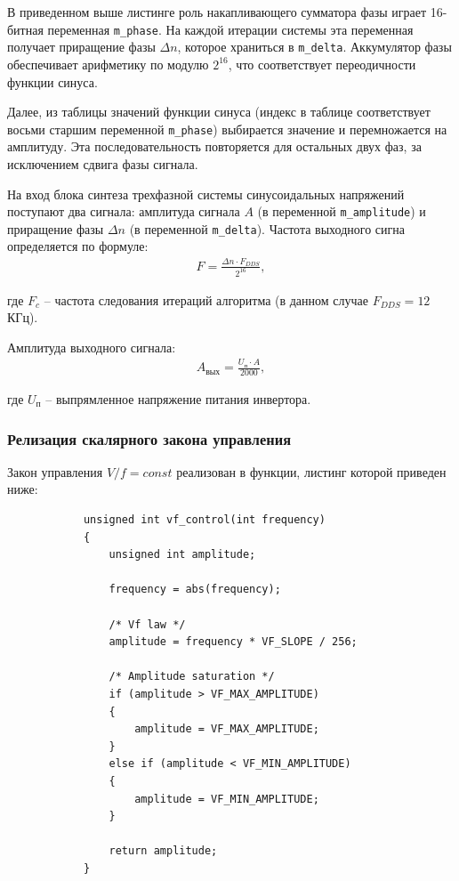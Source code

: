         В приведенном выше листинге роль накапливающего сумматора фазы играет
        16-битная переменная \verb"m_phase". На каждой итерации системы эта
        переменная получает приращение фазы $\Delta n$, которое храниться в
        \verb"m_delta". Аккумулятор фазы обеспечивает арифметику по модулю
        $2^{16}$, что соответствует переодичности функции синуса. 

        Далее, из таблицы значений функции синуса (индекс в таблице
        соответствует восьми старшим переменной \verb"m_phase") выбирается
        значение и перемножается на амплитуду. Эта последовательность
        повторяется для остальных двух фаз, за исключением сдвига фазы сигнала.

        На вход блока синтеза трехфазной системы синусоидальных напряжений
        поступают два сигнала: амплитуда сигнала $A$ (в переменной
        \verb"m_amplitude") и приращение фазы $\Delta n$ (в переменной
        \verb"m_delta"). Частота выходного сигна определяется по формуле:
        \begin{gather*}
            F = \frac{\Delta n \cdot F_{DDS}}{2^{16}},
        \end{gather*}

        где $F_c$ -- частота следования итераций алгоритма (в данном случае
        $F_{DDS} = 12$ КГц).

        Амплитуда выходного сигнала:
        \begin{gather*}
            A_\text{вых} = \frac{U_\text{п} \cdot A}{2000},
        \end{gather*}

        где $U_\text{п}$ -- выпрямленное напряжение питания инвертора. 

    \subsubsection{Релизация скалярного закона управления}
        Закон управления $V/f = const$ реализован в функции, листинг которой приведен ниже:
        \begin{verbatim}
            unsigned int vf_control(int frequency)
            {
                unsigned int amplitude;

                frequency = abs(frequency);

                /* Vf law */
                amplitude = frequency * VF_SLOPE / 256;

                /* Amplitude saturation */
                if (amplitude > VF_MAX_AMPLITUDE)
                {
                    amplitude = VF_MAX_AMPLITUDE;
                } 
                else if (amplitude < VF_MIN_AMPLITUDE)
                {
                    amplitude = VF_MIN_AMPLITUDE;
                }

                return amplitude;
            }
        \end{verbatim}
        
